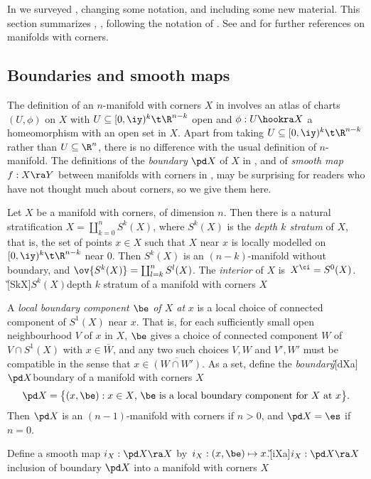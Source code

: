\documentclass{article}
\begin{document}
In \cite[Chap.~5]{Joyc6} we surveyed \cite{Joyc3}, changing some
notation, and including some new material. This section summarizes
\cite{Joyc3}, \cite[Chap.~5]{Joyc6}, following the notation of
\cite[Chap.~5]{Joyc6}. See \cite{Joyc3} and \cite[Chap.~5]{Joyc6}
for further references on manifolds with corners.

\subsection{Boundaries and smooth maps}
\label{ds51}

The definition of an $n$-manifold with corners $X$ in \cite[\S
2]{Joyc3} involves an atlas of charts $(U,\phi)$ on $X$ with
$U\subseteq[0,\iy)^k\t\R^{n-k}$ open and $\phi:U\hookra X$ a
homeomorphism with an open set in $X$. Apart from taking
$U\subseteq[0,\iy)^k\t\R^{n-k}$ rather than $U\subseteq\R^n$, there
is no difference with the usual definition of $n$-manifold. The
definitions of the {\it boundary\/} $\pd X$ of $X$ in \cite[\S
2]{Joyc3}, and of {\it smooth map\/} $f:X\ra Y$ between manifolds
with corners in \cite[\S 3]{Joyc3}, may be surprising for readers
who have not thought much about corners, so we give them here.

\begin{dfn} Let $X$ be a manifold with corners, of dimension $n$.
Then there is a natural stratification $X=\coprod_{k=0}^nS^k(X)$,
where $S^k(X)$ is the {\it depth\/ $k$ stratum} of $X$, that is, the
set of points $x\in X$ such that $X$ near $x$ is locally modelled on
$[0,\iy)^k\t\R^{n-k}$ near 0. Then $S^k(X)$ is an $(n-k)$-manifold
without boundary, and $\ov{S^k(X)}=\coprod_{l=k}^nS^l(X)$. The {\it
interior\/} of $X$ is~$X^\ci=S^0(X)$.\G[SkX]{$S^k(X)$}{depth $k$
stratum of a manifold with corners $X$}

A {\it local boundary component\/ $\be$ of\/ $X$ at\/} $x$ is a
local choice of connected component of $S^1(X)$ near $x$. That is,
for each sufficiently small open neighbourhood $V$ of $x$ in $X$,
$\be$ gives a choice of connected component $W$ of $V\cap S^1(X)$
with $x\in\overline W$, and any two such choices $V,W$ and $V',W'$
must be compatible in the sense that $x\in\overline{(W\cap W')}$. As
a set, define the {\it boundary\/}\G[dXa]{$\pd X$}{boundary of a
manifold with corners $X$}
\begin{equation*}
\pd X=\bigl\{(x,\be):\text{$x\in X$, $\be$ is a local boundary
component for $X$ at $x$}\bigr\}.
\end{equation*}
Then $\pd X$ is an $(n-1)$-manifold with corners if $n>0$, and $\pd
X=\es$ if~$n=0$.

Define a smooth map $i_X:\pd X\ra X$ by~$i_X:(x,\be)\mapsto
x$.\G[iXa]{$i_X:\pd X\ra X$}{inclusion of boundary $\pd X$ into a
manifold with corners $X$}
\label{ds5def1}
\end{dfn}
\end{document}
